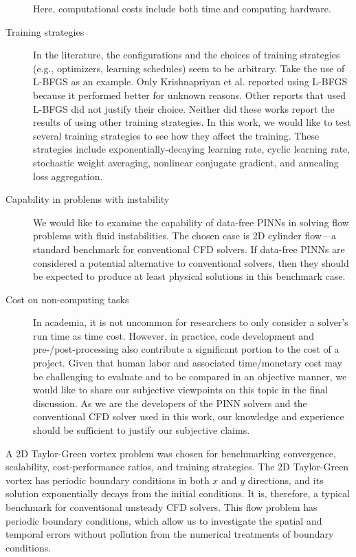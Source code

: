 \begin{description}
        Here, computational costs include both time and computing hardware.
    \item[Training strategies]
        In the literature, the configurations and the choices of training strategies (e.g., optimizers, learning schedules) seem to be arbitrary.
        Take the use of L-BFGS as an example.
        Only Krishnapriyan et al. \cite{krishnapriyan_characterizing_2021} reported using L-BFGS because it performed better for unknown reasons.
        Other reports that used L-BFGS did not justify their choice.
        Neither did these works report the results of using other training strategies.
        In this work, we would like to test several training strategies to see how they affect the training.
        These strategies include exponentially-decaying learning rate, cyclic learning rate, stochastic weight averaging, nonlinear conjugate gradient, and annealing loss aggregation.
    \item[Capability in problems with instability]
        We would like to examine the capability of data-free PINNs in solving flow problems with fluid instabilities.
        The chosen case is 2D cylinder flow---a standard benchmark for conventional CFD solvers.
        If data-free PINNs are considered a potential alternative to conventional solvers, then they should be expected to produce at least physical solutions in this benchmark case.
    \item[Cost on non-computing tasks]
        In academia, it is not uncommon for researchers to only consider a solver's run time as time cost.
        However, in practice, code development and pre-/post-processing also contribute a significant portion to the cost of a project.
        Given that human labor and associated time/monetary cost may be challenging to evaluate and to be compared in an objective manner, we would like to share our subjective viewpoints on this topic in the final discussion.
        As we are the developers of the PINN solvers and the conventional CFD solver used in this work, our knowledge and experience should be sufficient to justify our subjective claims.
\end{description}

A 2D Taylor-Green vortex problem was chosen for benchmarking convergence, scalability, cost-performance ratios, and training strategies.
The 2D Taylor-Green vortex has periodic boundary conditions in both $x$ and $y$ directions, and its solution exponentially decays from the initial conditions.
It is, therefore, a typical benchmark for conventional unsteady CFD solvers.
This flow problem has periodic boundary conditions, which allow us to investigate the spatial and temporal errors without pollution from the numerical treatments of boundary conditions.

